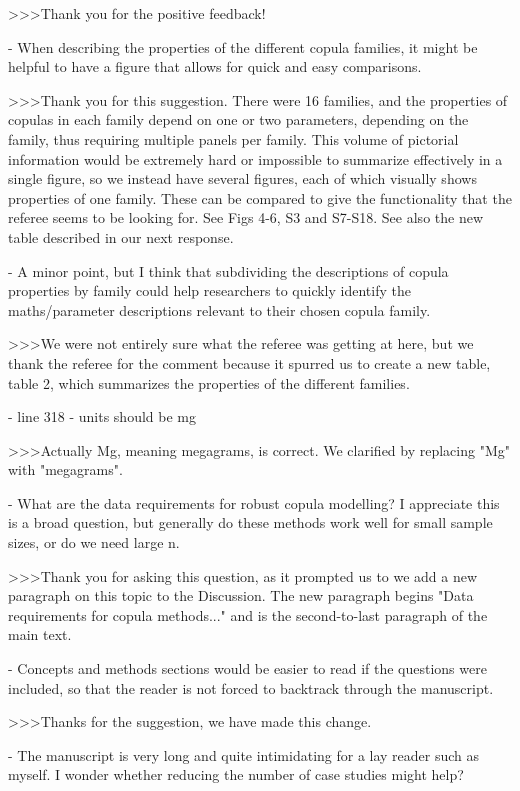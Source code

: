 >>>Thank you for the positive feedback!

- When describing the properties of the different copula families, it might be helpful to have a 
figure that allows for quick and easy comparisons.

>>>Thank you for this suggestion. There were 16 families, and the properties 
of copulas in each family depend on one or two parameters, depending on the 
family, thus requiring multiple panels per family. This volume of pictorial 
information would be extremely hard or impossible to summarize effectively in a 
single figure, so we instead have several figures, each of which visually 
shows properties of one family. These can be compared to give the functionality that 
the referee seems to be looking for. See Figs 4-6, S3 and S7-S18. See also the new
table described in our next response.

- A minor point, but I think that subdividing the descriptions of copula properties by family could 
help researchers to quickly identify the maths/parameter descriptions relevant to their chosen copula 
family.

>>>We were not entirely sure what the referee was getting at here, but we
thank the referee for the comment because it spurred us to create a new table, 
table 2, which summarizes the properties of the different families.

- line 318 - units should be mg

>>>Actually Mg, meaning megagrams, is correct. We clarified by replacing "Mg" 
with "megagrams".

- What are the data requirements for robust copula modelling? I appreciate this 
is a broad question, but generally do these methods work well for small sample 
sizes, or do we need large n.

>>>Thank you for asking this question, as it prompted us to we add a new paragraph
on this topic to the Discussion. The new paragraph begins "Data requirements for 
copula methods..." and is the second-to-last paragraph of the main text.

- Concepts and methods sections would be easier to read if the questions were 
included, so that the reader is not forced to backtrack through the manuscript.

>>>Thanks for the suggestion, we have made this change.

- The manuscript is very long and quite intimidating for a lay reader such as myself. I wonder whether reducing the number of case studies might help?

